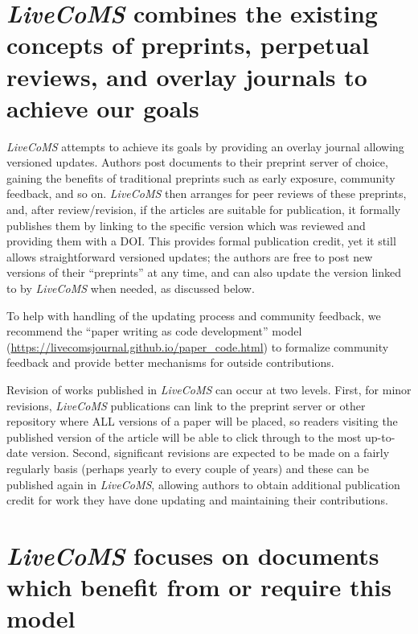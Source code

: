 \documentclass[9pt]{livecoms}
\begin{document}
\section{\emph{LiveCoMS} combines the existing concepts of preprints, perpetual reviews, and overlay journals to achieve our goals}

\emph{LiveCoMS} attempts to achieve its goals by providing an overlay journal allowing versioned updates.
Authors post documents to their preprint server of choice, gaining the benefits of traditional preprints such as early exposure, community feedback, and so on. 
\emph{LiveCoMS} then arranges for peer reviews of these preprints, and, after review/revision, if the articles are suitable for publication, it formally publishes them by linking to the specific version which was reviewed and providing them with a DOI.
This provides formal publication credit, yet it still allows straightforward versioned updates; the authors are free to post new versions of their ``preprints'' at any time, and can also update the version linked to by \emph{LiveCoMS} when needed, as discussed below.

To help with handling of the updating process and community feedback, we recommend the ``paper writing as code development'' model (\url{https://livecomsjournal.github.io/paper_code.html}) to formalize community feedback and provide better mechanisms for outside contributions. 

Revision of works published in \emph{LiveCoMS} can occur at two levels. 
First, for minor revisions, \emph{LiveCoMS} publications can link to the preprint server or other repository where ALL versions of a paper will be placed, so readers visiting the published version of the article will be able to click through to the most up-to-date version.
Second, significant revisions are expected to be made on a fairly regularly basis (perhaps yearly to every couple of years) and these can be published again in \emph{LiveCoMS}, allowing authors to obtain additional publication credit for work they have done updating and maintaining their contributions. 

\section{\emph{LiveCoMS} focuses on documents which benefit from or require this model}
\end{document}
